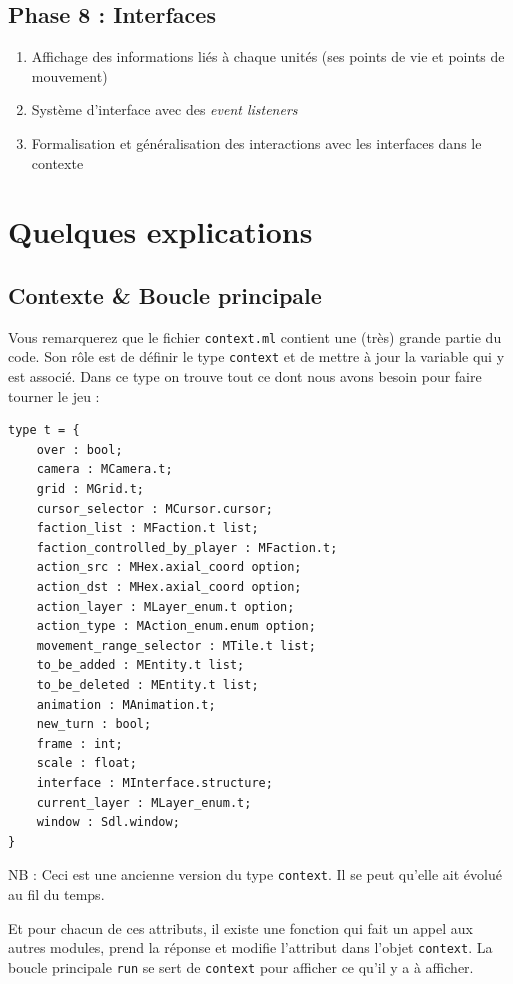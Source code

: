 \documentclass{article}
\begin{document}
\subsection*{Phase 8 : Interfaces}
\begin{enumerate}
    \item Affichage des informations liés à chaque unités (ses points de vie et points de mouvement)
    \item Système d'interface avec des \textit{event listeners}
    \item Formalisation et généralisation des interactions avec les interfaces dans le contexte
\end{enumerate}

\section{Quelques explications}
\subsection{Contexte \& Boucle principale}
Vous remarquerez que le fichier \texttt{context.ml} contient une (très) grande partie du code. Son rôle
est de définir le type \texttt{context} et de mettre à jour la variable qui y est associé.
Dans ce type on trouve tout ce dont nous avons besoin pour faire tourner le jeu : 

\begin{verbatim}
type t = {
    over : bool; 
    camera : MCamera.t;
    grid : MGrid.t;
    cursor_selector : MCursor.cursor;
    faction_list : MFaction.t list;
    faction_controlled_by_player : MFaction.t;
    action_src : MHex.axial_coord option;
    action_dst : MHex.axial_coord option;
    action_layer : MLayer_enum.t option;
    action_type : MAction_enum.enum option;
    movement_range_selector : MTile.t list;
    to_be_added : MEntity.t list;
    to_be_deleted : MEntity.t list;
    animation : MAnimation.t;
    new_turn : bool;
    frame : int;
    scale : float;
    interface : MInterface.structure;
    current_layer : MLayer_enum.t;
    window : Sdl.window;
}
\end{verbatim}

NB : Ceci est une ancienne version du type \texttt{context}. Il se peut qu'elle ait évolué au fil du temps.

Et pour chacun de ces attributs, il existe une fonction qui fait un appel aux autres modules, prend la réponse
et modifie l'attribut dans l'objet \texttt{context}. La boucle principale \texttt{run} se sert de \texttt{context}
pour afficher ce qu'il y a à afficher.
\end{document}
